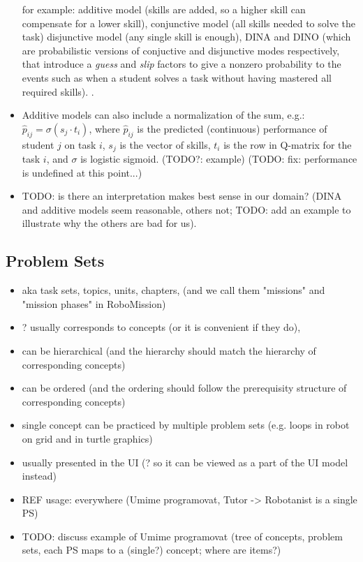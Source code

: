 \begin{itemize}
  for example:
    additive model (skills are added, so a higher skill can compensate for a lower skill),
    conjunctive model (all skills needed to solve the task)
    disjunctive model (any single skill is enough),
    DINA and DINO (which are probabilistic versions of conjuctive and disjunctive modes
    respectively, that introduce a \emph{guess} and \emph{slip} factors to give a nonzero
    probability to the events such as when a student solves a task without
    having mastered all required skills).
    \cite[chapter 3]{its-domain-models}.
\item Additive models can also include a normalization of the sum, e.g.:
  $\hat{p}_{ij} = \sigma(s_j \cdot t_i)$, where
  $\hat{p}_{ij}$ is the predicted (continuous) performance of student $j$ on task $i$,
  $s_j$ is the vector of skills, $t_i$ is the row in Q-matrix for the task $i$,
  and $\sigma$ is logistic sigmoid. (TODO?: example)
  (TODO: fix: performance is undefined at this point...)
\item TODO: is there an interpretation makes best sense in our domain?
  (DINA and additive models seem reasonable, others not;
  TODO: add an example to illustrate why the others are bad for us).
\end{itemize}


\subsection{Problem Sets}

\begin{itemize}
\item aka task sets, topics, units, chapters,
  (and we call them "missions" and "mission phases" in RoboMission)
\item ? usually corresponds to concepts (or it is convenient if they do),
\item can be hierarchical (and the hierarchy should match the hierarchy of
  corresponding concepts)
\item can be ordered (and the ordering should follow the prerequisity structure
  of corresponding concepts)
\item single concept can be practiced by multiple problem sets
  (e.g. loops in robot on grid and in turtle graphics)
\item usually presented in the UI (? so it can be viewed as a part of the UI model instead)
\item REF usage: everywhere (Umime programovat, Tutor -> Robotanist is a single PS)
\item TODO: discuss example of Umime programovat (tree of concepts, problem
  sets, each PS maps to a (single?) concept; where are items?)
\end{itemize}


